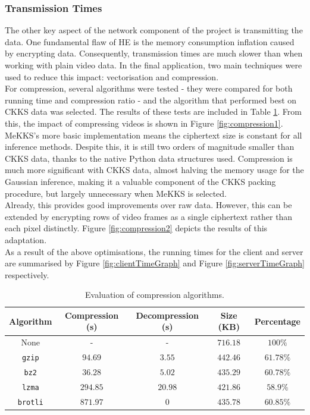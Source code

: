 \subsubsection{Transmission Times}
\indent \indent
The other key aspect of the network component of the project is transmitting the data. One fundamental flaw of HE is the memory consumption inflation caused by encrypting data. Consequently, transmission times are much slower than when working with plain video data. In the final application, two main techniques were used to reduce this impact: vectorisation and compression.
\smallskip \\ \indent
For compression, several algorithms were tested - they were compared for both running time and compression ratio - and the algorithm that performed best on CKKS data was selected. The results of these tests are included in Table \ref{tab:compression}. From this, the impact of compressing videos is shown in Figure \ref{fig:compression1}. MeKKS's more basic implementation means the ciphertext size is constant for all inference methods. Despite this, it is still two orders of magnitude smaller than CKKS data, thanks to the native Python data structures used. Compression is much more significant with CKKS data, almost halving the memory usage for the Gaussian inference, making it a valuable component of the CKKS packing procedure, but largely unnecessary when MeKKS is selected.
\smallskip \\ \indent
Already, this provides good improvements over raw data. However, this can be extended by encrypting rows of video frames as a single ciphertext rather than each pixel distinctly. Figure \ref{fig:compression2} depicts the results of this adaptation.
\smallskip \\ \indent
As a result of the above optimisations, the running times for the client and server are summarised by Figure \ref{fig:clientTimeGraph} and Figure \ref{fig:serverTimeGraph} respectively.
\begin{table}
    \centering
    \begin{tabular}{|c||c|c|c|c|}
        \hline
        \textrm{\textbf{Algorithm}} & \textrm{\textbf{Compression} (s)} & \textrm{\textbf{Decompression} (s)} & \textrm{\textbf{Size} (KB)} & \textrm{\textbf{Percentage}}
        \\ \hline \hline
        \textrm{None} & - & - & $716.18$ & $100\%$
        \\ \hline
        \texttt{gzip} & $94.69$ & $3.55$ & $442.46$ & $61.78\%$
        \\ \hline
        \texttt{bz2} & $36.28$ & $5.02$ & $435.29$ & $60.78\%$
        \\ \hline
        \texttt{lzma} & $294.85$ & $20.98$ & $421.86$ & $58.9\%$
        \\ \hline
        \texttt{brotli} & $871.97$ & $0$ & $435.78$  & $60.85\%$
        \\ \hline
    \end{tabular}%
    \caption[Compression algorithms]{Evaluation of compression algorithms.}
    \label{tab:compression}
\end{table}
